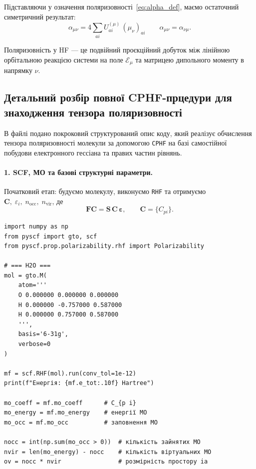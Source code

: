 Підставляючи у означення поляризовності~\eqref{eq:alpha_def},
маємо остаточний симетричний результат:
\begin{equation}\label{eq:HF_polarizability_final_sym}
	\alpha_{\mu\nu}
	=
	4 \sum_{ai}
	U^{(\mu)}_{ai}\,(\mu_{\nu})_{ai}
	\qquad
	\alpha_{\mu\nu}=\alpha_{\nu\mu}.
\end{equation}

Поляризовність у HF --- це подвійний проєкційний добуток між лінійною
орбітальною реакцією системи на поле \(\mathcal E_\mu\)
та матрицею дипольного моменту в напрямку \(\nu\).


\subsection{Детальний розбір повної CPHF-прцедури для знаходження тензора поляризовності}

В файлі  подано покроковий структурований опис коду, який реалізує обчислення тензора
поляризовності молекули  за допомогою \texttt{CPHF} на базі самостійної побудови
електронного гессіана та правих частин рівнянь.

\paragraph{1. SCF, МО та базові структурні параметри.}

Початковий етап: будуємо молекулу, виконуємо \texttt{RHF} та отримуємо
\(
\mathbf C,\;
\varepsilon_i,\;
n_{\text{occ}},\;
n_{\text{vir}}
\),
де
\[
	\mathbf F \mathbf C = \mathbf S\,\mathbf C\,\boldsymbol\varepsilon ,\qquad
	\mathbf C=\{C_{pi}\}.
\]

\begin{verbatim}
import numpy as np
from pyscf import gto, scf
from pyscf.prop.polarizability.rhf import Polarizability

# === H2O ===
mol = gto.M(
    atom='''
    O 0.000000 0.000000 0.000000
    H 0.000000 -0.757000 0.587000
    H 0.000000 0.757000 0.587000
    ''',
    basis='6-31g',
    verbose=0
)

mf = scf.RHF(mol).run(conv_tol=1e-12)
print(f"Енергія: {mf.e_tot:.10f} Hartree")

mo_coeff = mf.mo_coeff      # C_{p i}
mo_energy = mf.mo_energy    # енергії МО
mo_occ = mf.mo_occ          # заповнення МО

nocc = int(np.sum(mo_occ > 0))  # кількість зайнятих МО
nvir = len(mo_energy) - nocc    # кількість віртуальних МО
ov = nocc * nvir                # розмірність простору ia
\end{verbatim}

